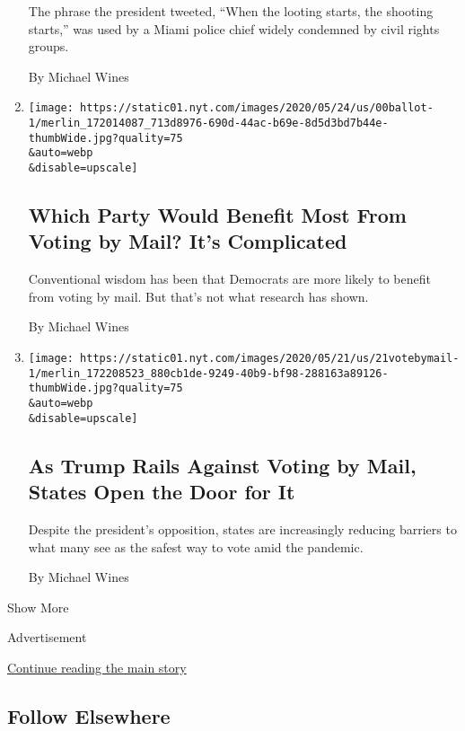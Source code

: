 \begin{enumerate}
  The phrase the president tweeted, ``When the looting starts, the
  shooting starts,'' was used by a Miami police chief widely condemned
  by civil rights groups.

  By Michael Wines
\item
  \href{/2020/05/25/us/vote-by-mail-coronavirus.html}{}

  \texttt{[image: https://static01.nyt.com/images/2020/05/24/us/00ballot-1/merlin\_172014087\_713d8976-690d-44ac-b69e-8d5d3bd7b44e-thumbWide.jpg?quality=75\\\&auto=webp\\\&disable=upscale]}

  \hypertarget{which-party-would-benefit-most-from-voting-by-mail-its-complicated}{%
  \subsection{Which Party Would Benefit Most From Voting by Mail? It's
  Complicated}\label{which-party-would-benefit-most-from-voting-by-mail-its-complicated}}

  Conventional wisdom has been that Democrats are more likely to benefit
  from voting by mail. But that's not what research has shown.

  By Michael Wines
\item
  \href{/2020/05/21/us/vote-by-mail-trump.html}{}

  \texttt{[image: https://static01.nyt.com/images/2020/05/21/us/21votebymail-1/merlin\_172208523\_880cb1de-9249-40b9-bf98-288163a89126-thumbWide.jpg?quality=75\\\&auto=webp\\\&disable=upscale]}

  \hypertarget{as-trump-rails-against-voting-by-mail-states-open-the-door-for-it}{%
  \subsection{As Trump Rails Against Voting by Mail, States Open the
  Door for
  It}\label{as-trump-rails-against-voting-by-mail-states-open-the-door-for-it}}

  Despite the president's opposition, states are increasingly reducing
  barriers to what many see as the safest way to vote amid the pandemic.

  By Michael Wines
\end{enumerate}

Show More

Advertisement

\protect\hyperlink{after-mid2}{Continue reading the main story}

\hypertarget{follow-elsewhere}{%
\subsection{Follow Elsewhere}\label{follow-elsewhere}}

